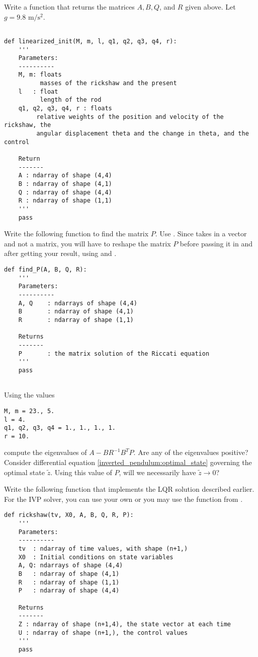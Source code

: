 
Write a function that returns the matrices $A, B, Q$, and $R$ given above. Let $g = 9.8\text{ m}/\text{s}^2$.	
	
\begin{lstlisting}

def linearized_init(M, m, l, q1, q2, q3, q4, r): 
	'''
	Parameters:
	----------
	M, m: floats
          masses of the rickshaw and the present
	l 	: float
          length of the rod
	q1, q2, q3, q4, r : floats
         relative weights of the position and velocity of the rickshaw, the 
		 angular displacement theta and the change in theta, and the control
	
	Return
	-------
	A : ndarray of shape (4,4) 
	B : ndarray of shape (4,1) 
	Q : ndarray of shape (4,4) 
	R : ndarray of shape (1,1) 
	'''
	pass	
\end{lstlisting}

Write the following function to find the matrix $P$. 
Use . 
Since  takes in a vector and not a matrix, you will have to reshape the matrix $P$ before passing it in and after getting your result, using  and .
\begin{lstlisting}
def find_P(A, B, Q, R):
	'''
	Parameters:
	----------
	A, Q 	: ndarrays of shape (4,4)
	B		: ndarray of shape (4,1)
	R		: ndarray of shape (1,1)
	
	Returns
	-------
	P		: the matrix solution of the Riccati equation
	'''
	pass


\end{lstlisting}
Using the values 
\begin{lstlisting}
M, m = 23., 5.
l = 4.
q1, q2, q3, q4 = 1., 1., 1., 1.
r = 10.
\end{lstlisting}
compute the eigenvalues of $A - BR^{-1}B^TP$.
Are any of the eigenvalues positive? 
Consider differential equation \eqref{inverted_pendulum:optimal_state} governing the optimal state $\tilde{z}$. 
Using this value of $P$, will we necessarily have $\tilde{z} \to 0$?

	Write the following function that implements the LQR solution described earlier.  For the IVP solver, you can use your own or you may use the function  from .
\begin{lstlisting}
def rickshaw(tv, X0, A, B, Q, R, P):
	'''
	Parameters:
	----------
	tv 	: ndarray of time values, with shape (n+1,)
	X0 	: Initial conditions on state variables
	A, Q: ndarrays of shape (4,4)
	B	: ndarray of shape (4,1)
	R	: ndarray of shape (1,1)
	P	: ndarray of shape (4,4)
	
	Returns
	-------
	Z : ndarray of shape (n+1,4), the state vector at each time
	U : ndarray of shape (n+1,), the control values
	'''
	pass
\end{lstlisting}
\label{prob:inverted_pendulum3}

